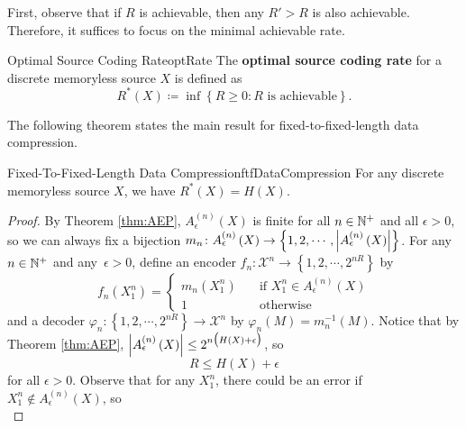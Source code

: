 \documentclass[math]{amznotes}
\theoremstyle{remark}
\begin{document}
First, observe that if $R$ is achievable, then any $R' > R$ is also achievable. Therefore, it suffices to focus on the minimal achievable rate.
\begin{dfnbox}{Optimal Source Coding Rate}{optRate}
    The {\color{red} \textbf{optimal source coding rate}} for a discrete memoryless source $X$ is defined as 
    \begin{equation*}
        R^*\left(X\right) \coloneqq \inf \left\{R \geq 0 \colon R \textrm{ is achievable}\right\}.
    \end{equation*}
\end{dfnbox}
The following theorem states the main result for fixed-to-fixed-length data compression.
\begin{thmbox}{Fixed-To-Fixed-Length Data Compression}{ftfDataCompression}
    For any discrete memoryless source $X$, we have $R^*\left(X\right) = H\left(X\right)$.
    \tcblower
    \begin{proof}
        By Theorem \ref{thm:AEP}, $A_{\epsilon}^{\left(n\right)}\left(X\right)$ is finite for all $n \in \mathbb{N}^+$ and all $\epsilon > 0$, so we can always fix a bijection $m_n \colon A_{\epsilon}^{\left(n\right)}\left(X\right) \to \left\{1, 2, \cdots, {\left\lvert {A_{\epsilon}^{\left(n\right)}\left(X\right)} \right\rvert}\right\}$. For any $n \in \mathbb{N}^+$ and any~$\epsilon > 0$, define an encoder $f_n \colon \mathcal{X}^n \to \left\{1, 2, \cdots, 2^{nR}\right\}$ by 
        \begin{equation*}
            f_n\left(X_1^n\right) = \begin{cases}
                m_n\left(X_1^n\right) & \quad\textrm{if } X_1^n \in A_{\epsilon}^{\left(n\right)}\left(X\right) \\
                1 & \quad\textrm{otherwise}
            \end{cases}
        \end{equation*}
        and a decoder $\varphi_n \colon \left\{1, 2, \cdots, 2^{nR}\right\} \to \mathcal{X}^n$ by $\varphi_n\left(M\right) = m_n^{-1}\left(M\right)$. Notice that by Theorem \ref{thm:AEP}, ${\left\lvert {A_{\epsilon}^{\left(n\right)}\left(X\right)} \right\rvert} \leq 2^{n\bigl(H\left(X\right) + \epsilon\bigr)}$, so
        \begin{equation*}
            R \leq H\left(X\right) + \epsilon
        \end{equation*}
        for all $\epsilon > 0$. Observe that for any $X_1^n$, there could be an error if $X_1^n \notin A_{\epsilon}^{\left(n\right)}\left(X\right)$, so 
        \begin{equation*}

\end{equation*}
\end{proof}
\end{thmbox}
\end{document}
